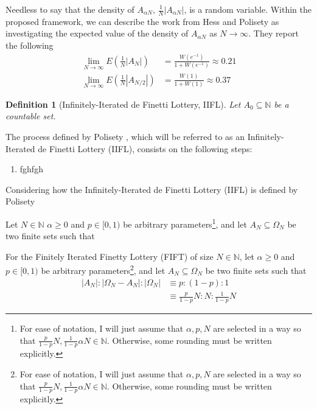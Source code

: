 \documentclass{article}
\newtheorem{definition}{Definition}
\newcommand{\N}{\mathbb{N}}
\newcommand{\card}[1]{\left| #1 \right|}
\newcommand{\ppar}[1]{\left( #1 \right)}
\begin{document}
Needless to say that the density of $A_{\alpha N}$, $\frac{1}{N}\card{ A_{\alpha N}}$, is a random variable.
%
Within the proposed framework,
we can describe the work from Hess and Polisety \cite{hess2023} as investigating the expected value of the density of $A_{\alpha N}$ as $N \rightarrow \infty$.
%
They report the following
\begin{align}
    \lim_{N \rightarrow \infty} E\ppar{\frac{1}{N}\card{ A_{N}}} 
    &=
    \frac{W\ppar{e^{-1}}}{1+W\ppar{e^{-1}}} \approx 0.21 
    \\
    \lim_{N \rightarrow \infty} E\ppar{\frac{1}{N}\card{ A_{N/2}}} 
    &=
    \frac{W\ppar{1}}{1+W\ppar{1}} \approx 0.37 
\end{align}

\begin{definition}[Infinitely-Iterated de Finetti Lottery, IIFL]
Let $A_0 \subseteq \N$ be a countable set.
\end{definition}

The process defined by Polisety \cite{hess2023}, which will be referred to as an Infinitely-Iterated de Finetti Lottery (IIFL), consists on the following steps:
\begin{enumerate}
    \item fghfgh
\end{enumerate}

Considering how the Infinitely-Iterated de Finetti Lottery (IIFL) is defined by Polisety \cite{hess2023}

Let $N\in \N$ $\alpha\geq 0$ and $p\in [0,1)$ be arbitrary parameters\footnote{For ease of notation, I will just assume that $\alpha, p, N$ are selected in a way so that $\frac{p}{1-p} N, \frac{1}{1-p} \alpha N \in \N$. Otherwise, some rounding must be written explicitly.}, and let $A_N \subseteq \Omega_N$ be two finite sets such that 


For the Finitely Iterated Finetty Lottery (FIFT) of size $N\in \N$, let $\alpha\geq 0$ and $p\in [0,1)$ be arbitrary parameters\footnote{For ease of notation, I will just assume that $\alpha, p, N$ are selected in a way so that $\frac{p}{1-p} N, \frac{1}{1-p} \alpha N \in \N$. Otherwise, some rounding must be written explicitly.}, and let $A_N \subseteq \Omega_N$ be two finite sets such that 
\begin{align}
    \card{A_N} : \card{\Omega_N-A_N} : \card{\Omega_N} 
    &\equiv p: (1-p) : 1
    \nonumber \\
    &\equiv
    \frac{p}{1-p} N : N : \frac{1}{1-p} N
\end{align}
\end{document}
